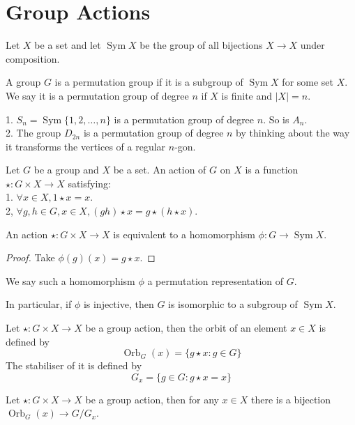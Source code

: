\section{Group Actions}
\begin{definition}
    Let $X$ be a set and let $\operatorname{Sym}X$ be the group of all bijections $X\to X$ under composition.
\end{definition}
\begin{definition}
    A group $G$ is a permutation group if it is a subgroup of $\operatorname{Sym}X$ for some set $X$.
    We say it is a permutation group of degree $n$ if $X$ is finite and $|X|=n$.
\end{definition}
\begin{example}
    1. $S_n=\operatorname{Sym}\{1,2,\ldots,n\}$ is a permutation group of degree $n$.
    So is $A_n$.\\
    2. The group $D_{2n}$ is a permutation group of degree $n$ by thinking about the way it transforms the vertices of a regular $n$-gon.
\end{example}
\begin{definition}
    Let $G$ be a group and $X$ be a set.
    An action of $G$ on $X$ is a function $\star:G\times X\to X$ satisfying:\\
    1. $\forall x\in X,1\star x=x$.\\
    2, $\forall g,h\in G,x\in X,(gh)\star x=g\star (h\star x)$.
\end{definition}
\begin{proposition}
    An action $\star:G\times X\to X$ is equivalent to a homomorphism $\phi:G\to\operatorname{Sym}X$.
\end{proposition}
\begin{proof}
    Take $\phi(g)(x)=g\star x$.
\end{proof}
\begin{definition}
    We say such a homomorphism $\phi$ a permutation representation of $G$.
\end{definition}
In particular, if $\phi$ is injective, then $G$ is isomorphic to a subgroup of $\operatorname{Sym}X$.
\begin{definition}
    Let $\star:G\times X\to X$ be a group action, then the orbit of an element $x\in X$ is defined by
    $$\operatorname{Orb}_G(x)=\{g\star x:g\in G\}$$
    The stabiliser of it is defined by
    $$G_x=\{g\in G:g\star x=x\}$$
\end{definition}
\begin{theorem}
    Let $\star:G\times X\to X$ be a group action, then for any $x\in X$ there is a bijection $\operatorname{Orb}_G(x)\to G/G_x$.
\end{theorem}
